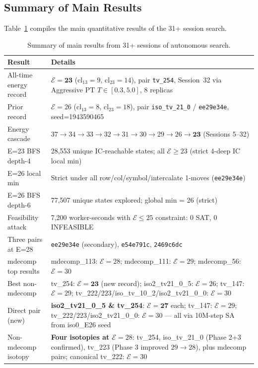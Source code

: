 \documentclass[11pt,a4paper]{article}
\theoremstyle{remark}
\newcommand{\cl}{\mathrm{cl}}
\newcommand{\E}{\mathcal{E}}
\begin{document}
\subsection{Summary of Main Results}

Table~\ref{tab:summary} compiles the main quantitative results of the 31+ session search.

\begin{table}[h]
\centering
\caption{Summary of main results from 31+ sessions of autonomous search.}\label{tab:summary}
\begin{tabular}{lp{8cm}}
\toprule
Result & Details\\
\midrule
All-time energy record & $\E=\mathbf{23}$ ($\cl_{13}=9$, $\cl_{23}=14$), pair \texttt{tv\_254}, Session~32 via Aggressive PT $T\!\in\![0.3,5.0]$, 8 replicas\\
Prior record & $\E=26$ ($\cl_{13}=8$, $\cl_{23}=18$), pair \texttt{iso\_tv\_21\_0} / \texttt{ee29e34e}, seed=1943590465\\
Energy cascade & $37 \to 34 \to 33 \to 32 \to 31 \to 30 \to 29 \to 26 \to \mathbf{23}$ (Sessions 5--32)\\
E=23 BFS depth-4 & 28,553 unique IC-reachable states; all $\E \geq 23$ (strict 4-deep IC local min)\\
E=26 local min & Strict under all row/col/symbol/intercalate 1-moves (\texttt{ee29e34e})\\
E=26 BFS depth-6 & 77,507 unique states explored; global min = 26 (strict)\\
Feasibility attack & 7,200 worker-seconds with $\E \leq 25$ constraint: 0 SAT, 0 INFEASIBLE\\
Three pairs at E=28 & \texttt{ee29e34e} (secondary), \texttt{e54e791c}, \texttt{2469c6dc}\\
mdecomp top results & mdecomp\_113: $\E=28$; mdecomp\_111: $\E=29$; mdecomp\_56: $\E=30$\\
Best non-mdecomp & tv\_254: $\E=\mathbf{23}$ (new record); iso2\_tv21\_0\_5: $\E=26$; tv\_147: $\E=29$; tv\_222/223/iso\_tv\_10\_2/iso2\_tv21\_0\_0: $\E=30$\\
Direct pair (new) & \textbf{iso2\_tv21\_0\_5 \& tv\_254}: $\E=\mathbf{27}$ each;
  tv\_147: $\E=29$; tv\_222/223/iso2\_tv21\_0\_0: $\E=30$ --- all via 10M-step SA from iso0\_E26 seed\\
Non-mdecomp isotopy & \textbf{Four isotopies at $\E=28$}: tv\_254, iso\_tv\_21\_0 (Phase 2+3 confirmed), tv\_223 (Phase 3 improved $29\!\to\!28$), plus mdecomp pairs; canonical tv\_222: $\E=30$\\

\end{tabular}
\end{table}
\end{document}
